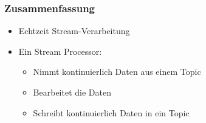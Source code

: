 \begin{frame}
\frametitle{Zusammenfassung}

\begin{itemize}
	\item Echtzeit Stream-Verarbeitung
	\item Ein Stream Processor:
	\begin{itemize}
		\item Nimmt kontinuierlich Daten aus einem Topic   %
		\item Bearbeitet die Daten %
		\item Schreibt kontinuierlich Daten in ein Topic %
	\end{itemize}
\end{itemize}

\end{frame}


